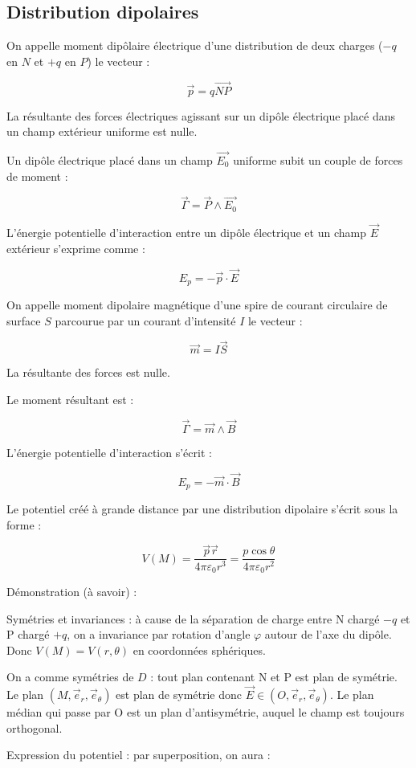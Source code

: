 \documentclass[a4paper,12pt]{book}
\newcommand{\Def}[2]{\begin{tcolorbox}[colback=white,colframe=red!10!green!20!blue!75!, title=Définition : #1]#2\end{tcolorbox}}
\newcommand{\Thr}[2]{\begin{tcolorbox}[sharp corners, colback=white,colframe=red!10!blue!30!green!75!, title=Théorème : #1]#2\end{tcolorbox}}
\renewcommand{\Vec}[1]{\overrightarrow{#1}}
\begin{document}
\subsection{Distribution dipolaires}
\Def{}{On appelle moment dipôlaire électrique d'une distribution de deux charges ($-q$ en $N$ et $+q$ en $P$) le vecteur :
\par $$\Vec{p} = q\Vec{NP}$$
\par La résultante des forces électriques agissant sur un dipôle électrique placé dans un champ extérieur uniforme est nulle.
\par Un dipôle électrique placé dans un champ $\Vec{E_0}$ uniforme subit un couple de forces de moment :
\par $$\Vec{\Gamma} = \Vec{P}\wedge\Vec{E_0}$$
\par L'énergie potentielle d'interaction entre un dipôle électrique et un champ $\Vec{E}$ extérieur s'exprime comme :
\par $$E_p =-\Vec{p}\cdot\Vec{E}$$}
\Def{}{On appelle moment dipolaire magnétique d'une spire de courant circulaire de surface $S$ parcourue par un courant d'intensité $I$ le vecteur :
\par $$\Vec{m} = I\Vec{S}$$
\par La résultante des forces est nulle.
\par Le moment résultant est :
\par $$\Vec{\Gamma} = \Vec{m}\wedge\Vec{B}$$
\par L'énergie potentielle d'interaction s'écrit :
\par $$E_p = -\Vec{m}\cdot\Vec{B}$$}
\Thr{}{Le potentiel créé à grande distance par une distribution dipolaire s'écrit sous la forme :
\par $$V(M) = \frac{\Vec{p}\Vec{r}}{4\pi\varepsilon_0r^3} =\frac{p\cos\theta}{4\pi\varepsilon_0r^2}$$}
Démonstration (à savoir) :
\par Symétries et invariances : à cause de la séparation de charge entre N chargé $-q$ et P chargé $+q$, on a invariance par rotation d'angle $\varphi$ autour de l'axe du dipôle. Donc $V(M)=V(r,\theta)$ en coordonnées sphériques.
\par On a comme symétries de $D$ : tout plan contenant N et P est plan de symétrie. Le plan $(M,\vec{e}_r, \vec{e}_\theta)$ est plan de symétrie donc $\vec{E}\in (O, \vec{e}_r,\vec{e}_\theta)$. Le plan médian qui passe par O est un plan d'antisymétrie, auquel le champ est toujours orthogonal.
\par Expression du potentiel : par superposition, on aura :
\end{document}
